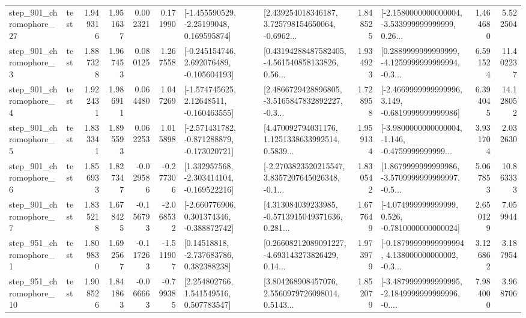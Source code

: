 \begin{tabular}{llrrrrllrlrr}
  step\_901\_chromophore\_27 &      test &      1.949316 &    1.951637 &      0.002321 &  0.171990 &    [-1.455590529, -2.25199048, 0.169595874] &  [2.439254018346187, 3.725798154650064, -0.6962... &       1.848525 &  [-2.1580000000000004, -3.533999999999999, 0.26... &            1.464680 &          5.522504 \\
   step\_901\_chromophore\_3 &      test &      1.887328 &    1.967453 &      0.080125 &  1.267558 &   [-0.245154746, 2.692076489, -0.105604193] &  [0.43194288487582405, -4.561540858133826, 0.56... &       1.934923 &  [0.2889999999999999, -4.1259999999999994, -0.3... &            6.591524 &         11.402237 \\
   step\_901\_chromophore\_4 &      test &      1.922431 &    1.986911 &      0.064480 &  1.047269 &    [-1.574745625, 2.12648511, -0.160463555] &  [2.4866729428896805, -3.5165847832892227, -0.3... &       1.728958 &  [-2.4669999999999996, 3.149, -0.6819999999999986] &            6.394045 &         14.128052 \\
   step\_901\_chromophore\_5 &      test &      1.833341 &    1.895593 &      0.062253 &  1.015898 &  [-2.571431782, -0.871288879, -0.173020721] &  [4.470092794031176, 1.1251338633992514, 0.5839... &       1.959134 &  [-3.9800000000000004, -1.146, -0.4759999999999... &            3.931704 &          2.032630 \\
   step\_901\_chromophore\_6 &      test &      1.856933 &    1.827347 &     -0.029586 & -0.277306 &   [1.332957568, -2.303414104, -0.169522216] &  [-2.2703823520215547, 3.8357207645026348, -0.1... &       1.830542 &  [1.8679999999999986, -3.5709999999999997, -0.5... &            5.067853 &         10.863333 \\
   step\_901\_chromophore\_7 &      test &      1.835218 &    1.678425 &     -0.156793 & -2.068532 &   [-2.660776906, 0.301374346, -0.388872742] &  [4.313084039233985, -0.5713915049371636, 0.281... &       1.677649 &   [-4.074999999999999, 0.526, -0.7810000000000024] &            2.650129 &          7.059944 \\
   step\_951\_chromophore\_1 &      test &      1.809830 &    1.692567 &     -0.117263 & -1.511907 &     [0.14518818, -2.737683786, 0.382388238] &  [0.26608212089091227, -4.693143273826429, 0.14... &       1.973979 &  [-0.18799999999999994, 4.138000000000002, -0.3... &            3.126862 &          3.187954 \\
  step\_951\_chromophore\_10 &      test &      1.908526 &    1.841863 &     -0.066663 & -0.799385 &     [2.254802766, 1.541549516, 0.507783547] &  [3.804268908457076, 2.5560979726098014, 0.5143... &       1.852079 &  [-3.4879999999999995, -2.1849999999999996, -0.... &            7.984000 &          3.968706 \\

\end{tabular}
